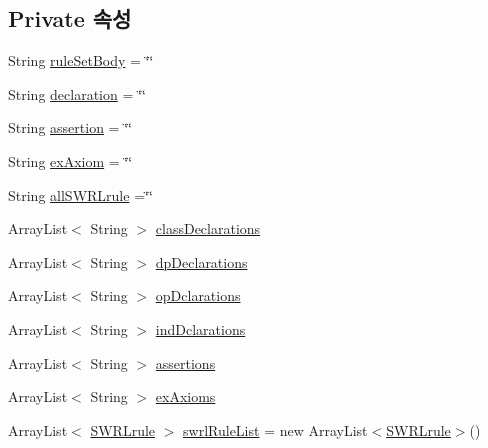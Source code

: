 \subsection*{Private 속성}
\begin{DoxyCompactItemize}
\item 
String \mbox{\hyperlink{classcom_1_1github_1_1aites_1_1framework_1_1ruleset_1_1_rule_set_body_a44e75b2b411bc4d99bc2b2bb775f9338}{rule\+Set\+Body}} = \char`\"{}\char`\"{}
\item 
String \mbox{\hyperlink{classcom_1_1github_1_1aites_1_1framework_1_1ruleset_1_1_rule_set_body_a2cf57d61b47b322bf4e866cb15c4a7e3}{declaration}} = \char`\"{}\char`\"{}
\item 
String \mbox{\hyperlink{classcom_1_1github_1_1aites_1_1framework_1_1ruleset_1_1_rule_set_body_ab62022dc0ddd4ff056e82433b74d07d5}{assertion}} = \char`\"{}\char`\"{}
\item 
String \mbox{\hyperlink{classcom_1_1github_1_1aites_1_1framework_1_1ruleset_1_1_rule_set_body_a792ba02a126ff1152f0a9b94e7452274}{ex\+Axiom}} = \char`\"{}\char`\"{}
\item 
String \mbox{\hyperlink{classcom_1_1github_1_1aites_1_1framework_1_1ruleset_1_1_rule_set_body_aa658ea44f4d978fc5964ab0f1b5ea96c}{all\+S\+W\+R\+Lrule}} =\char`\"{}\char`\"{}
\item 
Array\+List$<$ String $>$ \mbox{\hyperlink{classcom_1_1github_1_1aites_1_1framework_1_1ruleset_1_1_rule_set_body_a01a0ea947278595b1ebd1b13a5d1c7cd}{class\+Declarations}}
\item 
Array\+List$<$ String $>$ \mbox{\hyperlink{classcom_1_1github_1_1aites_1_1framework_1_1ruleset_1_1_rule_set_body_a04dba43584689b29c9da9a357effe069}{dp\+Declarations}}
\item 
Array\+List$<$ String $>$ \mbox{\hyperlink{classcom_1_1github_1_1aites_1_1framework_1_1ruleset_1_1_rule_set_body_af528c6344f8e8c5b070a93bf12c440b4}{op\+Dclarations}}
\item 
Array\+List$<$ String $>$ \mbox{\hyperlink{classcom_1_1github_1_1aites_1_1framework_1_1ruleset_1_1_rule_set_body_ac25f4ee84e59e4ebfc47452c84ead7c6}{ind\+Dclarations}}
\item 
Array\+List$<$ String $>$ \mbox{\hyperlink{classcom_1_1github_1_1aites_1_1framework_1_1ruleset_1_1_rule_set_body_adc0be27d8b17ccd369c32843397404e6}{assertions}}
\item 
Array\+List$<$ String $>$ \mbox{\hyperlink{classcom_1_1github_1_1aites_1_1framework_1_1ruleset_1_1_rule_set_body_a2577a5a3b737968f1d836d6e0a83daba}{ex\+Axioms}}
\item 
Array\+List$<$ \mbox{\hyperlink{classcom_1_1github_1_1aites_1_1framework_1_1rule_1_1_s_w_r_lrule}{S\+W\+R\+Lrule}} $>$ \mbox{\hyperlink{classcom_1_1github_1_1aites_1_1framework_1_1ruleset_1_1_rule_set_body_aa0c93dd6d2a58be027c0d55f742d0b64}{swrl\+Rule\+List}} = new Array\+List$<$\mbox{\hyperlink{classcom_1_1github_1_1aites_1_1framework_1_1rule_1_1_s_w_r_lrule}{S\+W\+R\+Lrule}}$>$()
\end{DoxyCompactItemize}


